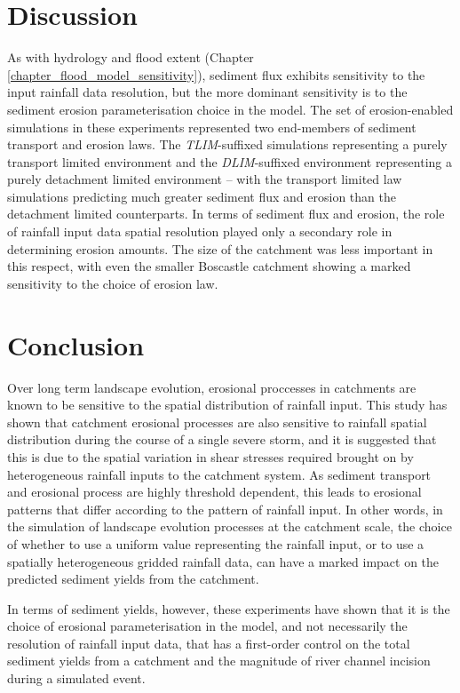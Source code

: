 \section{Discussion}

As with hydrology and flood extent (Chapter \ref{chapter_flood_model_sensitivity}), sediment flux exhibits sensitivity to the input rainfall data resolution, but the more dominant sensitivity is to the sediment erosion parameterisation choice in the model. The set of erosion-enabled simulations in these experiments represented two end-members of sediment transport and erosion laws. The \textit{TLIM}-suffixed simulations representing a purely transport limited environment and the \textit{DLIM}-suffixed environment representing a purely detachment limited environment -- with the transport limited law simulations predicting much greater sediment flux and erosion than the detachment limited counterparts. In terms of sediment flux and erosion, the role of rainfall input data spatial resolution played only a secondary role in determining erosion amounts. The size of the catchment was less important in this respect, with even the smaller Boscastle catchment showing a marked sensitivity to the choice of erosion law.

\section{Conclusion}
Over long term landscape evolution, erosional proccesses in catchments are known to be sensitive to the spatial distribution of rainfall input.  This study has shown that catchment erosional processes are also sensitive to rainfall spatial distribution during the course of a single severe storm, and it is suggested that this is due to the spatial variation in shear stresses required brought on by heterogeneous rainfall inputs to the catchment system.  As sediment transport and erosional process are highly threshold dependent, this leads to erosional patterns that differ according to the pattern of rainfall input. In other words, in the simulation of landscape evolution processes at the catchment scale, the choice of whether to use a uniform value representing the rainfall input, or to use a spatially heterogeneous gridded rainfall data, can have a marked impact on the predicted sediment yields from the catchment.

In terms of sediment yields, however, these experiments have shown that it is the choice of erosional parameterisation in the model, and not necessarily the resolution of rainfall input data, that has a first-order control on the total sediment yields from a catchment and the magnitude of river channel incision during a simulated event.

